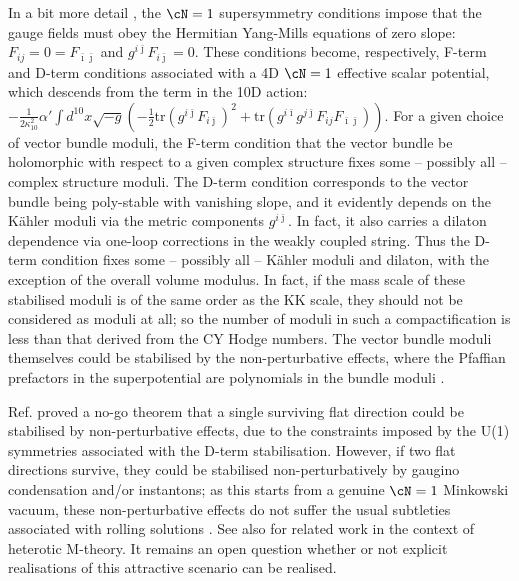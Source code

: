 \begin{itemize}
 In a bit more detail \cite{Anderson:2010mh, Anderson:2011cza, Anderson:2011ty}, the $\cN=1$ supersymmetry conditions impose that the gauge fields must obey the Hermitian Yang-Mills equations of zero slope: $F_{ij} = 0 = F_{\bar{\imath}\bar{\jmath}}$ and $g^{i\bar{\jmath}}F_{i\bar{\jmath}}=0$.  These conditions become, respectively, F-term and D-term conditions associated with a 4D $\cN=1$ effective scalar potential, which descends from the term in the 10D action: $-\frac{1}{2\kappa_{10}^2}\alpha'\int d^{10}x \sqrt{-g} \left(-\frac12 \textrm{tr}(g^{i\bar{\jmath}}F_{i\bar{\jmath}})^2+\textrm{tr}(g^{i\bar{\imath}} g^{j\bar{\jmath}} F_{ij} F_{\bar{\imath}\bar{\jmath}})\right)$.  For a given choice of vector bundle moduli, the F-term condition that the vector bundle be holomorphic with respect to a given complex structure fixes some -- possibly all -- complex structure moduli. The D-term condition corresponds to the vector bundle being poly-stable with vanishing slope, and it evidently depends on the K\"ahler moduli via the metric components $g^{i\bar{\jmath}}$.  In fact, it also carries a dilaton dependence via one-loop corrections in the weakly coupled string.  Thus the D-term condition fixes some -- possibly all -- K\"ahler moduli and dilaton, with the exception of the overall volume modulus.  In fact, if the mass scale of these stabilised moduli is of the same order as the KK scale, they should not be considered as moduli at all; so the number of moduli in such a compactification is less than that derived from the CY Hodge numbers.  The vector bundle moduli themselves could be stabilised by the non-perturbative effects, where the Pfaffian prefactors in the superpotential are polynomials in the bundle moduli \cite{Buchbinder:2002ic, Buchbinder:2002pr}.

 Ref. \cite{Anderson:2011cza} proved a no-go theorem that a single surviving flat direction could be stabilised by non-perturbative effects, due to the constraints imposed by the U(1) symmetries associated with the D-term stabilisation.  However, if two flat directions survive, they could be stabilised non-perturbatively by gaugino condensation and/or instantons; as this starts from a genuine $\cN=1$ Minkowski vacuum, these non-perturbative effects do not suffer the usual subtleties associated with rolling solutions \cite{Sethi:2017phn}.  See also \cite{Becker:2004gw, Braun:2006th} for related work in the context of heterotic M-theory.  It remains an open question whether or not explicit realisations of this attractive scenario can be realised.


\end{itemize}
